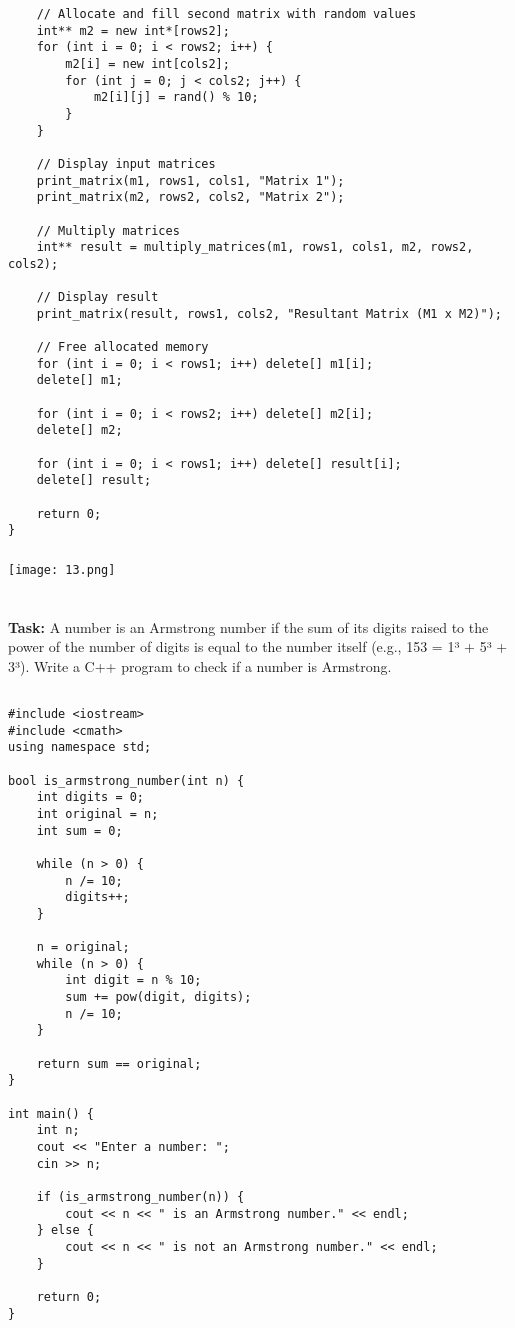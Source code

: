 \documentclass[12pt,a4paper]{article}
\begin{document}
\begin{lstlisting}
    // Allocate and fill second matrix with random values
    int** m2 = new int*[rows2];
    for (int i = 0; i < rows2; i++) {
        m2[i] = new int[cols2];
        for (int j = 0; j < cols2; j++) {
            m2[i][j] = rand() % 10;
        }
    }

    // Display input matrices
    print_matrix(m1, rows1, cols1, "Matrix 1");
    print_matrix(m2, rows2, cols2, "Matrix 2");

    // Multiply matrices
    int** result = multiply_matrices(m1, rows1, cols1, m2, rows2, cols2);

    // Display result
    print_matrix(result, rows1, cols2, "Resultant Matrix (M1 x M2)");

    // Free allocated memory
    for (int i = 0; i < rows1; i++) delete[] m1[i];
    delete[] m1;

    for (int i = 0; i < rows2; i++) delete[] m2[i];
    delete[] m2;

    for (int i = 0; i < rows1; i++) delete[] result[i];
    delete[] result;

    return 0;
}

\end{lstlisting}

\subsubsection{}
\begin{center}
    \texttt{[image: 13.png]}
\end{center}


\section{}
\textbf{Task:} A number is an Armstrong number if the sum of its digits raised to the power of the number of digits is equal to the number itself (e.g., 153 = 1³ + 5³ + 3³).  Write a C++ program to check if a number is Armstrong.

\subsection{}
\begin{lstlisting}
#include <iostream>
#include <cmath>
using namespace std;

bool is_armstrong_number(int n) {
    int digits = 0;
    int original = n;
    int sum = 0;

    while (n > 0) {
        n /= 10;
        digits++;
    }

    n = original;
    while (n > 0) {
        int digit = n % 10;
        sum += pow(digit, digits);
        n /= 10;
    }

    return sum == original;
}

int main() {
    int n;
    cout << "Enter a number: ";
    cin >> n;

    if (is_armstrong_number(n)) {
        cout << n << " is an Armstrong number." << endl;
    } else {
        cout << n << " is not an Armstrong number." << endl;
    }

    return 0;
}
\end{lstlisting}
\end{document}
